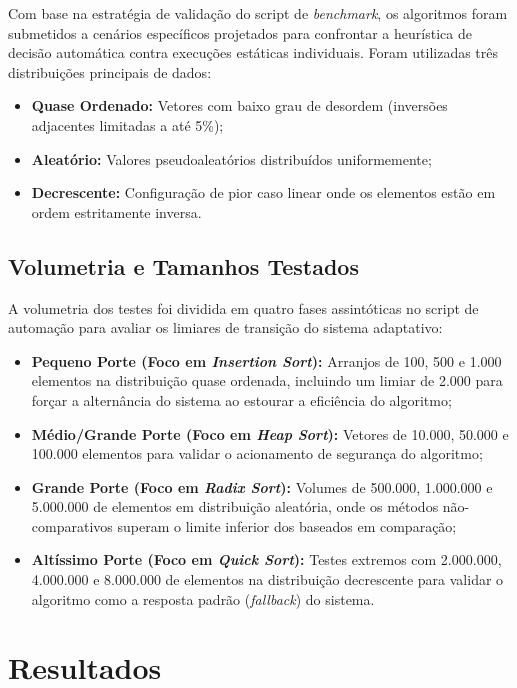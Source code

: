 \documentclass{article}
\begin{document}
Com base na estratégia de validação do script de \textit{benchmark}, os algoritmos foram submetidos a cenários específicos projetados para confrontar a heurística de decisão automática contra execuções estáticas individuais. Foram utilizadas três distribuições principais de dados:

\begin{itemize}
    \item \textbf{Quase Ordenado:} Vetores com baixo grau de desordem (inversões adjacentes limitadas a até 5\%);
    \item \textbf{Aleatório:} Valores pseudoaleatórios distribuídos uniformemente;
    \item \textbf{Decrescente:} Configuração de pior caso linear onde os elementos estão em ordem estritamente inversa.
\end{itemize}

\subsection{Volumetria e Tamanhos Testados}

A volumetria dos testes foi dividida em quatro fases assintóticas no script de automação para avaliar os limiares de transição do sistema adaptativo:

\begin{itemize}
    \item \textbf{Pequeno Porte (Foco em \textit{Insertion Sort}):} Arranjos de 100, 500 e 1.000 elementos na distribuição quase ordenada, incluindo um limiar de 2.000 para forçar a alternância do sistema ao estourar a eficiência do algoritmo;
    \item \textbf{Médio/Grande Porte (Foco em \textit{Heap Sort}):} Vetores de 10.000, 50.000 e 100.000 elementos para validar o acionamento de segurança do algoritmo;
    \item \textbf{Grande Porte (Foco em \textit{Radix Sort}):} Volumes de 500.000, 1.000.000 e 5.000.000 de elementos em distribuição aleatória, onde os métodos não-comparativos superam o limite inferior dos baseados em comparação;
    \item \textbf{Altíssimo Porte (Foco em \textit{Quick Sort}):} Testes extremos com 2.000.000, 4.000.000 e 8.000.000 de elementos na distribuição decrescente para validar o algoritmo como a resposta padrão (\textit{fallback}) do sistema.
\end{itemize}




\section{Resultados}
\end{document}
